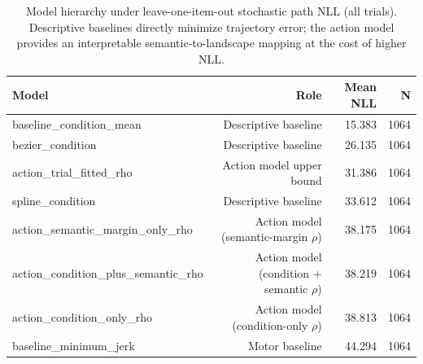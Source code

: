 \begin{table}[htbp]
\centering
\caption{Model hierarchy under leave-one-item-out stochastic path NLL (all trials). Descriptive baselines directly minimize trajectory error; the action model provides an interpretable semantic-to-landscape mapping at the cost of higher NLL.}
\label{tab:model-hierarchy}
\begin{tabular}{lrrr}
\toprule
Model & Role & Mean NLL & N \\
\midrule
baseline\_condition\_mean & Descriptive baseline & 15.383 & 1064 \\
bezier\_condition & Descriptive baseline & 26.135 & 1064 \\
action\_trial\_fitted\_rho & Action model upper bound & 31.386 & 1064 \\
spline\_condition & Descriptive baseline & 33.612 & 1064 \\
action\_semantic\_margin\_only\_rho & Action model (semantic-margin $\rho$) & 38.175 & 1064 \\
action\_condition\_plus\_semantic\_rho & Action model (condition + semantic $\rho$) & 38.219 & 1064 \\
action\_condition\_only\_rho & Action model (condition-only $\rho$) & 38.813 & 1064 \\
baseline\_minimum\_jerk & Motor baseline & 44.294 & 1064 \\
\bottomrule
\end{tabular}
\end{table}
